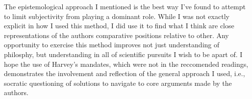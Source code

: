 \documentclass[12pt,a4paper]{article}
\begin{document}
The epistemological approach I mentioned is the best way I've found to attempt to limit subjectivity from playing a dominant role. While I was not exactly explicit in how I used this method, I did use it to find what I think are close representations of the authors comparative positions relative to other. Any opportunity to exercise this method improves not just understanding of philosphy, but understanding in all of scientific pursuits I wish to be apart of. I hope the use of Harvey's mandates, which were not in the reccomended readings, demonstrates the involvement and reflection of the general approach I used, i.e., socratic questioning of solutions to navigate to core arguments made by the authors. 






\clearpage


\end{document}
